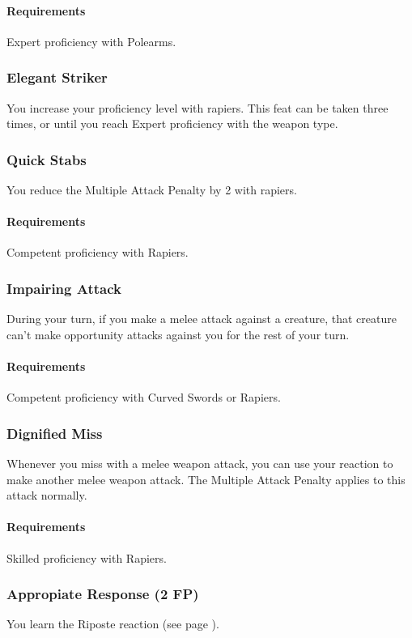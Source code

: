     \paragraph{Requirements} Expert proficiency with Polearms.
\subsubsection{Elegant Striker} \label{feat::elegantstriker}
    You increase your proficiency level with rapiers.
    This feat can be taken three times, or until you reach Expert proficiency with the weapon type.
\subsubsection{Quick Stabs} \label{feat::quickstabs}
    You reduce the Multiple Attack Penalty by 2 with rapiers.
    \paragraph{Requirements} Competent proficiency with Rapiers.
\subsubsection{Impairing Attack} \label{feat::impairingattack}
    During your turn, if you make a melee attack against a creature, that creature can't make opportunity attacks against you for the rest of your turn.
    \paragraph{Requirements} Competent proficiency with Curved Swords or Rapiers.
\subsubsection{Dignified Miss} \label{feat::dignifiedmiss}
    Whenever you miss with a melee weapon attack, you can use your reaction to make another melee weapon attack.
    The Multiple Attack Penalty applies to this attack normally.
    \paragraph{Requirements} Skilled proficiency with Rapiers.
\subsubsection{Appropiate Response (2 FP)} \label{feat::appropiateresponse}
    You learn the Riposte reaction (see page \pageref{act::riposte}).

